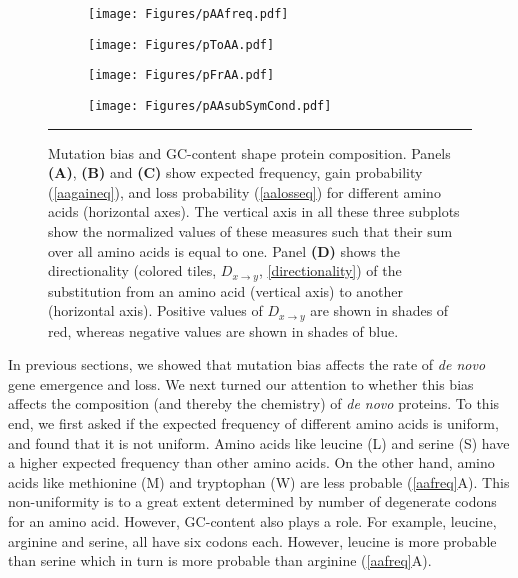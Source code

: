 \documentclass[12pt,a4paper]{article}
\begin{document}
\begin{figure}[!t]
\centering
\begin{subfigure}{0.47\textwidth}
\caption{}
\flushleft
\texttt{[image: Figures/pAAfreq.pdf]}
\end{subfigure}\hfill%
\begin{subfigure}{0.47\textwidth}
\caption{}
\flushleft
\texttt{[image: Figures/pToAA.pdf]}
\end{subfigure}

\vspace{1em}

\begin{subfigure}[t]{0.47\textwidth}
\caption{}
\flushleft
\texttt{[image: Figures/pFrAA.pdf]}
\end{subfigure}\hfill%
\begin{subfigure}[t]{0.47\textwidth}
\caption{}
\flushright
\texttt{[image: Figures/pAAsubSymCond.pdf]}
\end{subfigure}

\caption{Mutation bias and GC-content shape protein composition. Panels \textbf{(A)}, \textbf{(B)} and \textbf{(C)} show expected frequency, gain probability (\autoref{aagaineq}), and loss probability (\autoref{aalosseq}) for different amino acids (horizontal axes). The vertical axis in all these three subplots show the normalized values of these measures such that their sum over all amino acids is equal to one. Panel \textbf{(D)} shows the directionality (colored tiles, $\textit{D}_{x\to y}$, \autoref{directionality}) of the substitution from an amino acid (vertical axis) to another (horizontal axis). Positive values of $\textit{D}_{x\to y}$ are shown in shades of red, whereas negative values are shown in shades of blue.}
\label{aafreq}

\vspace{1ex}
\hrule
\end{figure}

In previous sections, we showed that mutation bias affects the rate of \textit{de novo} gene emergence and loss. We next turned our attention to whether this bias affects the composition (and thereby the chemistry) of \textit{de novo} proteins. To this end, we first asked if the expected frequency of different amino acids is uniform, and found that it is not uniform. Amino acids like leucine (L) and serine (S) have a higher expected frequency than other amino acids. On the other hand, amino acids like methionine (M) and tryptophan (W) are less probable (\autoref{aafreq}{\color{blue}A}). This non-uniformity is to a great extent determined by number of degenerate codons for an amino acid. However, GC-content also plays a role. For example, leucine, arginine and serine, all have six codons each. However, leucine is more probable than serine which in turn is more probable than arginine (\autoref{aafreq}{\color{blue}A}). 
\end{document}
